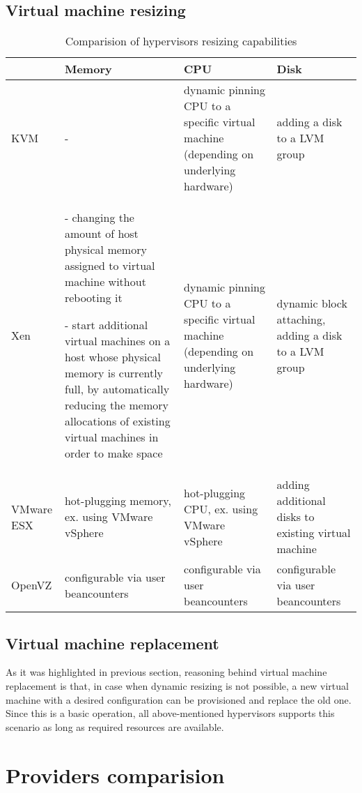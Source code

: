 \subsection*{Virtual machine resizing}


\begin{table}[!htbp]
\begin{tabularx}{\textwidth}{| l | X | X | X |}
\hline
 & \textbf{Memory} & \textbf{CPU} & \textbf{Disk} \\
\hline 
KVM &
-  & 
dynamic pinning CPU to a specific virtual machine (depending on underlying hardware)
& 
adding a disk to a LVM group

\\ \hline
Xen & 
- changing the amount of host physical memory assigned to virtual machine without rebooting it

- start additional virtual machines on a host whose physical memory is currently full, by automatically reducing the memory allocations of existing virtual machines in order to make space
&
dynamic pinning CPU to a specific virtual machine (depending on underlying hardware)
&
dynamic block attaching, adding a disk to a LVM group

\\ \hline
VMware ESX &
hot-plugging memory, ex. using VMware vSphere
&
hot-plugging CPU, ex. using VMware vSphere
&
adding additional disks to existing virtual machine

\\ \hline
OpenVZ &
configurable via user beancounters
&
configurable via user beancounters 
& 
configurable via user beancounters
\\ \hline
\end{tabularx}
\caption{Comparision of hypervisors resizing capabilities}
\label{tab:hypervisors-resizing}
\end{table}


\subsection*{Virtual machine replacement}
As it was highlighted in previous section, reasoning behind virtual machine replacement is that, in case when dynamic resizing is not possible, a new virtual machine with a desired configuration can be provisioned and replace the old one. Since this is a basic operation, all above-mentioned hypervisors supports this scenario as long as required resources are available. 

\section{Providers comparision}

